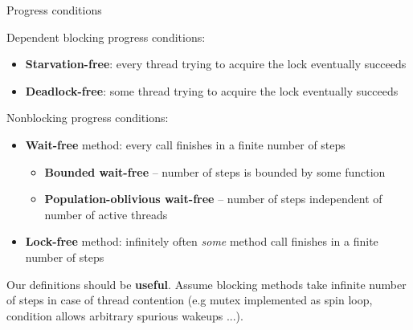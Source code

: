 

\begin{frame}[t,noframenumbering]{Progress conditions}

Dependent blocking progress conditions:
\begin{itemize}
  \item \textbf{Starvation-free}: every thread trying to acquire the lock eventually succeeds
  \item \textbf{Deadlock-free}: some thread trying to acquire the lock eventually succeeds
\end{itemize}

Nonblocking progress conditions:
\begin{itemize}
  \item \textbf{Wait-free} method: every call finishes in a finite number of steps
  \begin{itemize}
    \item \textbf{Bounded wait-free} -- number of steps is bounded by some function
    \item \textbf{Population-oblivious wait-free} -- number of steps independent of number of active threads
  \end{itemize}

  \item \textbf{Lock-free} method: infinitely often \textit{some} method call finishes in a finite number of steps
\end{itemize}

Our definitions should be \textbf{useful}. Assume blocking methods take infinite number of steps in case of thread contention (e.g mutex implemented as spin loop, condition allows arbitrary spurious wakeups ...).

\end{frame}

